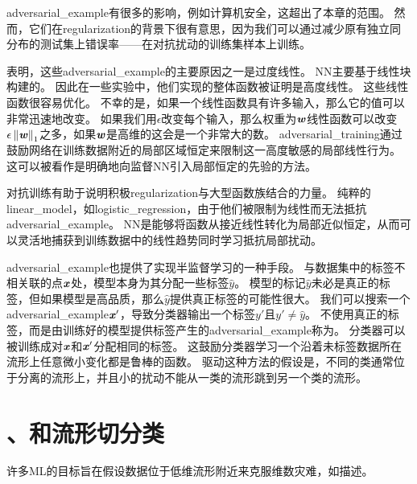 
\gls{adversarial_example}有很多的影响，例如计算机安全，这超出了本章的范围。
然而，它们在\gls{regularization}的背景下很有意思，因为我们可以通过减少原有独立同分布的测试集上错误率——在对抗扰动的训练集样本上训练\citep{Szegedy-ICLR2014,Goodfellow-2015-adversarial}。


\cite{Goodfellow-2015-adversarial}表明，这些\gls{adversarial_example}的主要原因之一是过度线性。
\gls{NN}主要基于线性块构建的。
因此在一些实验中，他们实现的整体函数被证明是高度线性。
这些线性函数很容易优化。
不幸的是，如果一个线性函数具有许多输入，那么它的值可以非常迅速地改变。
如果我们用$\epsilon$改变每个输入，那么权重为$\boldsymbol{\mathit{w}}$线性函数可以改变$\epsilon \left\lVert\boldsymbol{\mathit{w}}\right\rVert_1$之多，如果$\boldsymbol{\mathit{w}}$是高维的这会是一个非常大的数。
\gls{adversarial_training}通过鼓励网络在训练数据附近的局部区域恒定来限制这一高度敏感的局部线性行为。
这可以被看作是明确地向监督\gls{NN}引入局部恒定的先验的方法。

对抗训练有助于说明积极\gls{regularization}与大型函数族结合的力量。
纯粹的\gls{linear_model}，如\gls{logistic_regression}，由于他们被限制为线性而无法抵抗\gls{adversarial_example}。
\gls{NN}是能够将函数从接近线性转化为局部近似恒定，从而可以灵活地捕获到训练数据中的线性趋势同时学习抵抗局部扰动。

\gls{adversarial_example}也提供了实现半监督学习的一种手段。
与数据集中的标签不相关联的点$\boldsymbol{\mathit{x}}$处，模型本身为其分配一些标签$\hat y$。
模型的标记$\hat y$未必是真正的标签，但如果模型是高品质，那么$\hat y$提供真正标签的可能性很大。
我们可以搜索一个\gls{adversarial_example}$\boldsymbol{\mathit{x}}'$，导致分类器输出一个标签$y'$且$y' \neq \hat y$。
不使用真正的标签，而是由训练好的模型提供标签产生的\gls{adversarial_example}称为\citep{miyato2015distributional}。
分类器可以被训练成对$\boldsymbol{\mathit{x}}$和$\boldsymbol{\mathit{x}}'$分配相同的标签。
这鼓励分类器学习一个沿着未标签数据所在流形上任意微小变化都是鲁棒的函数。
驱动这种方法的假设是，不同的类通常位于分离的流形上，并且小的扰动不能从一类的流形跳到另一个类的流形。


\section{、和流形切分类}
\label{sec:tangent_distance_tangent_prop_and_manifold_tangent_classifier}
许多\gls{ML}的目标旨在假设数据位于低维流形附近来克服维数灾难，如描述。

